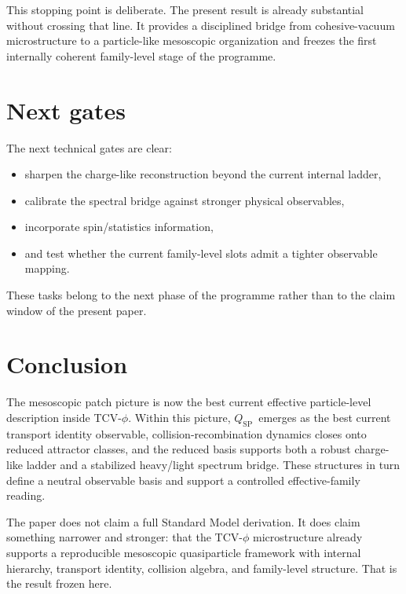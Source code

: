 \documentclass[aps,prd,onecolumn,nofootinbib,superscriptaddress]{revtex4-2}
\newcommand{\qsp}{\ensuremath{Q_{\mathrm{SP}}}}
\begin{document}
This stopping point is deliberate.
The present result is already substantial without crossing that line.
It provides a disciplined bridge from cohesive-vacuum microstructure to a particle-like mesoscopic organization and freezes the first internally coherent family-level stage of the programme.

\section{Next gates}
The next technical gates are clear:
\begin{itemize}
  \item sharpen the charge-like reconstruction beyond the current internal ladder,
  \item calibrate the spectral bridge against stronger physical observables,
  \item incorporate spin/statistics information,
  \item and test whether the current family-level slots admit a tighter observable mapping.
\end{itemize}
These tasks belong to the next phase of the programme rather than to the claim window of the present paper.

\section{Conclusion}
The mesoscopic patch picture is now the best current effective particle-level description inside TCV-$\phi$.
Within this picture, \qsp\ emerges as the best current transport identity observable, collision-recombination dynamics closes onto reduced attractor classes, and the reduced basis supports both a robust charge-like ladder and a stabilized heavy/light spectrum bridge.
These structures in turn define a neutral observable basis and support a controlled effective-family reading.

The paper does not claim a full Standard Model derivation.
It does claim something narrower and stronger:
that the TCV-$\phi$ microstructure already supports a reproducible mesoscopic quasiparticle framework with internal hierarchy, transport identity, collision algebra, and family-level structure.
That is the result frozen here.
\end{document}
